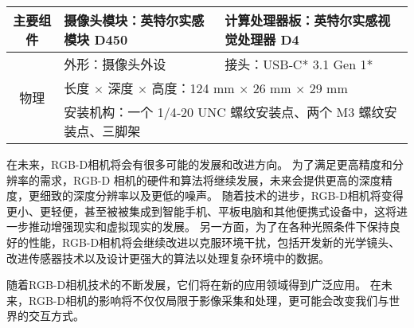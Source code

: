 \begin{table}[htb]
\begin{tabular}{c|ll}
		\midrule
		主要组件                 & 摄像头模块：英特尔实感模块 D450                                                                  & 计算处理器板：英特尔实感视觉处理器 D4                                                \\

		\midrule
		\multirow{3}{*}{物理}  & 外形：摄像头外设                                                                            & 接头：USB‑C* 3.1 Gen 1*                                                \\
		                     & \multicolumn{2}{l}{长度 $\times$ 深度 $\times$ 高度：124 mm $\times$ 26 mm $\times$ 29 mm}                                                                       \\
		                     & \multicolumn{2}{l}{安装机构：一个 1/4‑20 UNC 螺纹安装点、两个 M3 螺纹安装点、三脚架}                                                                                              \\

		\bottomrule
	\end{tabular}
\end{table}

\par 在未来，RGB-D相机将会有很多可能的发展和改进方向。
为了满足更高精度和分辨率的需求，RGB-D 相机的硬件和算法将继续发展，未来会提供更高的深度精度，更细致的深度分辨率以及更低的噪声。
随着技术的进步，RGB-D相机将变得更小、更轻便，甚至被被集成到智能手机、平板电脑和其他便携式设备中\cite{alkhawaja_jaradat_romdhane_2023}，这将进一步推动增强现实和虚拟现实的发展。
另一方面，为了在各种光照条件下保持良好的性能，RGB-D相机将会继续改进以克服环境干扰\cite{EfficientRGB-DSLAM}，包括开发新的光学镜头、改进传感器技术以及设计更强大的算法以处理复杂环境中的数据。

\par 随着RGB-D相机技术的不断发展，它们将在新的应用领域得到广泛应用\cite{rgbd_ad,rgbd_respiratory}。
在未来，RGB-D相机的影响将不仅仅局限于影像采集和处理，更可能会改变我们与世界的交互方式。
